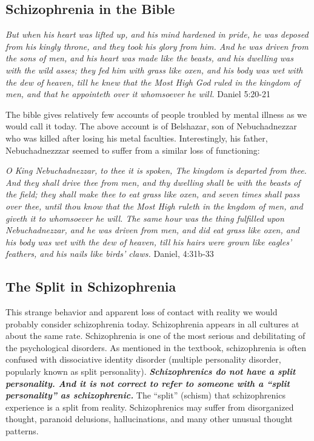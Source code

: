 \documentclass[
]{book}
\begin{document}
\hypertarget{schizophrenia-in-the-bible}{%
\subsection*{Schizophrenia in the Bible}\label{schizophrenia-in-the-bible}}

\emph{But when his heart was lifted up, and his mind hardened in pride, he was deposed from his kingly throne, and they took his glory from him. And he was driven from the sons of men, and his heart was made like the beasts, and his dwelling was with the wild asses; they fed him with grass like oxen, and his body was wet with the dew of heaven, till he knew that the Most High God ruled in the kingdom of men, and that he appointeth over it whomsoever he will.} Daniel 5:20-21

The bible gives relatively few accounts of people troubled by mental illness as we would call it today. The above account is of Belshazar, son of Nebuchadnezzar who was killed after losing his metal faculties. Interestingly, his father, Nebuchadnezzzar seemed to suffer from a similar loss of functioning:

\emph{O King Nebuchadnezzar, to thee it is spoken, The kingdom is departed from thee. And they shall drive thee from men, and thy dwelling shall be with the beasts of the field; they shall make thee to eat grass like oxen, and seven times shall pass over thee, until thou know that the Most High ruleth in the kngdom of men, and giveth it to whomsoever he will. The same hour was the thing fulfilled upon Nebuchadnezzar, and he was driven from men, and did eat grass like oxen, and his body was wet with the dew of heaven, till his hairs were grown like eagles' feathers, and his nails like birds' claws.} Daniel, 4:31b-33

\hypertarget{the-split-in-schizophrenia}{%
\subsection*{The Split in Schizophrenia}\label{the-split-in-schizophrenia}}

This strange behavior and apparent loss of contact with reality we would probably consider schizophrenia today. Schizophrenia appears in all cultures at about the same rate. Schizophrenia is one of the most serious and debilitating of the psychological disorders. As mentioned in the textbook, schizophrenia is often confused with dissociative identity disorder (multiple personality disorder, popularly known as split personality). \textbf{\emph{Schizophrenics do not have a split personality. And it is not correct to refer to someone with a ``split personality'' as schizophrenic.}} The ``split'' (schism) that schizophrenics experience is a split from reality. Schizophrenics may suffer from disorganized thought, paranoid delusions, hallucinations, and many other unusual thought patterns.
\end{document}
